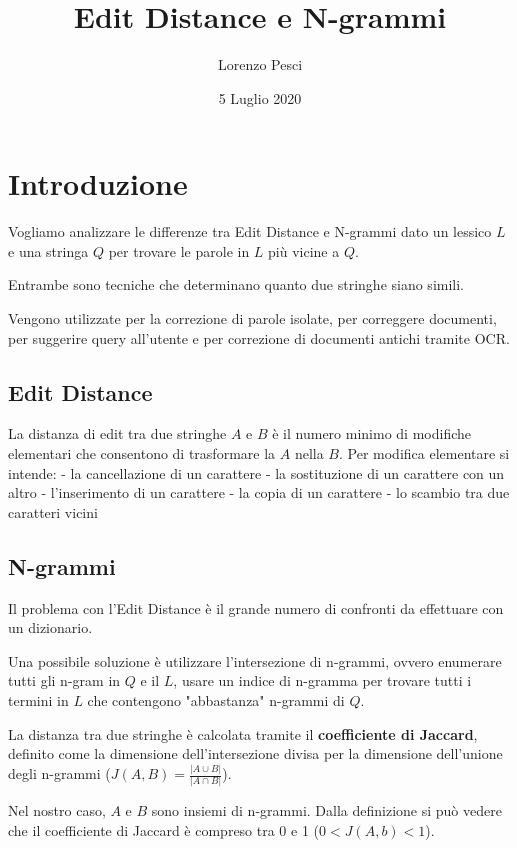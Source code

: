 \documentclass[a4paper,12pt]{article}
\title{Edit Distance e N-grammi}
\author{Lorenzo Pesci}
\date{5 Luglio 2020}
\begin{document}
\maketitle

\section{Introduzione}
Vogliamo analizzare le differenze tra Edit Distance e N-grammi dato un lessico $L$ e una stringa $Q$ per trovare le parole in $L$ più vicine a $Q$.

Entrambe sono tecniche che determinano quanto due stringhe siano simili.

Vengono utilizzate per la correzione di parole isolate, per correggere documenti, per suggerire query all'utente e per correzione di documenti antichi tramite OCR.

\subsection{Edit Distance}
La distanza di edit tra due stringhe $A$ e $B$ è il numero minimo di modifiche elementari che consentono di trasformare la $A$ nella $B$. Per modifica elementare si intende:
\newline
- la cancellazione di un carattere \newline
- la sostituzione di un carattere con un altro \newline
- l'inserimento di un carattere \newline
- la copia di un carattere \newline
- lo scambio tra due caratteri vicini

\subsection{N-grammi}
Il problema con l'Edit Distance è il grande numero di confronti da effettuare con un dizionario.

Una possibile soluzione è utilizzare l'intersezione di n-grammi, ovvero enumerare tutti gli n-gram in $Q$ e il $L$, usare un indice di n-gramma per trovare tutti i termini in $L$ che contengono "abbastanza" n-grammi di $Q$.

La distanza tra due stringhe è calcolata tramite il \textbf{coefficiente di Jaccard}, definito come la dimensione dell'intersezione divisa per la dimensione dell'unione degli n-grammi ($J(A,B) = \frac{|A \cup B|}{|A \cap B|}$).

Nel nostro caso, $A$ e $B$ sono insiemi di n-grammi.
Dalla definizione si può vedere che il coefficiente di Jaccard è compreso tra 0 e 1 ($0<J(A,b)<1$).
\end{document}
